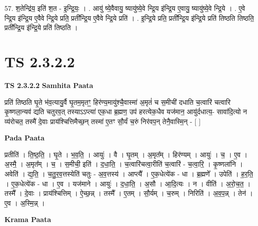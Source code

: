 \documentclass[17pt]{extarticle}
\begin{document}
57. श॒तेन्द्रि॑य॒ इति॑ श॒त - इ॒न्द्रि॒यः॒ । . आयु॑ ष्ये॒वैवायु॒ ष्यायु॑ष्ये॒वे न्द्रि॒य इ॑न्द्रि॒य ए॒वायु॒ ष्यायु॑ष्ये॒वे न्द्रि॒ये । . ए॒वे न्द्रि॒य इ॑न्द्रि॒य ए॒वैवे न्द्रि॒ये प्रति॒ प्रती᳚न्द्रि॒य ए॒वैवे न्द्रि॒ये प्रति॑ । . इ॒न्द्रि॒ये प्रति॒ प्रती᳚न्द्रि॒य इ॑न्द्रि॒ये प्रति॑ तिष्ठति तिष्ठति॒ प्रती᳚न्द्रि॒य इ॑न्द्रि॒ये प्रति॑ तिष्ठति । \newline
\pagebreak
{}

\section{ TS 2.3.2.2 }

\textbf{TS 2.3.2.2 } \newline
\textbf{Samhita Paata} \newline

प्रति॑ तिष्ठति घृ॒ते भ॑व॒त्यायु॒र्वै घृ॒तम॒मृतꣳ॒॒ हिर॑ण्य॒मायु॑श्चै॒वास्मा॑ अ॒मृतं॑ च स॒मीची॑ दधाति च॒त्वारि॑ चत्वारि कृ॒ष्णला॒न्यव॑ द्यति चतुरव॒त् तस्याऽऽप्त्या॑ एक॒धा ब्र॒ह्मण॒ उप॑ हरत्येक॒धैव यज॑मान॒ आयु॑र्दधात्य॒- सावा॑दि॒त्यो न व्य॑रोचत॒ तस्मै॑ दे॒वाः प्राय॑श्चित्तिमैच्छ॒न् तस्मा॑ ए॒तꣳ सौ॒र्यं च॒रुं निर॑वप॒न् तेनै॒वास्मि॒न् - [  ] \newline

\textbf{Pada Paata} \newline

प्रतीति॑ । ति॒ष्ठ॒ति॒ । घृ॒ते । भ॒व॒ति॒ । आयुः॑ । वै । घृ॒तम् । अ॒मृत᳚म् । हिर॑ण्यम् । आयुः॑ । च॒ । ए॒व । अ॒स्मै॒ । अ॒मृत᳚म् । च॒ । स॒मीची॒ इति॑ । द॒धा॒ति॒ । च॒त्वारि॑चत्वा॒रीति॑ च॒त्वारि॑ - च॒त्वा॒रि॒ । कृ॒ष्णला॑नि । अवेति॑ । द्य॒ति॒ । च॒तु॒र॒व॒त्तस्येति॑ चतुः - अ॒व॒त्तस्य॑ । आप्त्यै᳚ । ए॒क॒धेत्ये॑क - धा । ब्र॒ह्मणे᳚ । उपेति॑ । ह॒र॒ति॒ । ए॒क॒धेत्ये॑क - धा । ए॒व । यज॑माने । आयुः॑ । द॒धा॒ति॒ । अ॒सौ । आ॒दि॒त्यः । न । वीति॑ । अ॒रो॒च॒त॒ । तस्मै᳚ । दे॒वाः । प्राय॑श्चित्तिम् । ऐ॒च्छ॒न्न् । तस्मै᳚ । ए॒तम् । सौ॒र्यम् । च॒रुम् । निरिति॑ । अ॒व॒प॒न्न् । तेन॑ । ए॒व । अ॒स्मि॒न्न् ।  \newline


\textbf{Krama Paata} \newline
\end{document}
